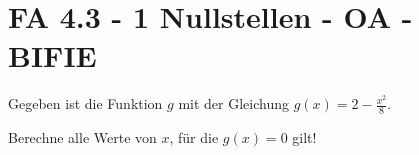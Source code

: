\section{FA 4.3 - 1 Nullstellen - OA - BIFIE}

\begin{beispiel}[FA 4.3]{1} %
				Gegeben ist die Funktion $g$ mit der Gleichung $g(x)=2-\frac{x^2}{8}$.

Berechne alle Werte von $x$, für die $g(x)=0$ gilt!

\end{beispiel}